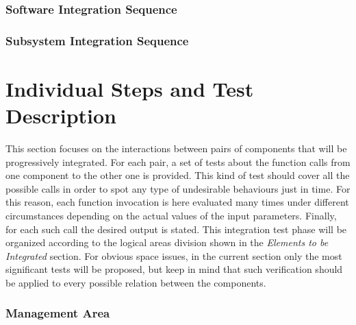 \documentclass[11pt,a4paper]{report}
\begin{document}
\subsection{Software Integration Sequence}
\subsection{Subsystem Integration Sequence}

\chapter[Individual Steps and Test Description]{Individual Steps and Test \\Description}
This section focuses on the interactions between pairs of components that will be progressively integrated. For each pair, a set of tests about the  function calls from one component to the other one is provided. This kind of test should cover all the possible calls in order to spot any type of undesirable behaviours just in time. For this reason, each function invocation is here evaluated many times under different circumstances depending on the actual values of the input parameters. Finally, for each such call the desired output is stated.
This integration test phase will be organized according to the logical areas division shown in the \textit{Elements to be Integrated} section.
For obvious space issues, in the current section only the most significant tests will be proposed, but keep in mind that such verification should be applied to every possible relation between the components.
\subsection{Management Area}
\end{document}
